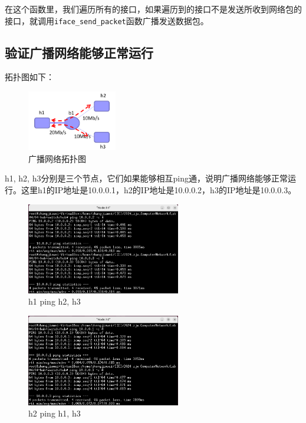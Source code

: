 \documentclass[UTF8]{report}
\begin{document}
在这个函数里，我们遍历所有的接口，如果遍历到的接口不是发送所收到网络包的接口，就调用\texttt{iface\_send\_packet}函数广播发送数据包。

\subsection{验证广播网络能够正常运行}

拓扑图如下：

\begin{figure}[H]
    \centering
    \includegraphics[width=0.35\textwidth]{topo1.png}
    \caption{广播网络拓扑图}
\end{figure}

h1, h2, h3分别是三个节点，它们如果能够相互ping通，说明广播网络能够正常运行。这里h1的IP地址是10.0.0.1，h2的IP地址是10.0.0.2，h3的IP地址是10.0.0.3。

\begin{figure}[H]
    \centering
    \includegraphics[width=0.6\textwidth]{h1ping.png}
    \caption{h1 ping h2, h3}
\end{figure}

\begin{figure}[H]
    \centering
    \includegraphics[width=0.6\textwidth]{h2ping.png}
    \caption{h2 ping h1, h3}
\end{figure}
\end{document}
